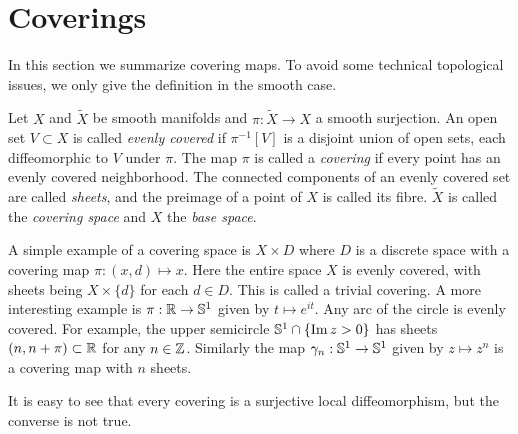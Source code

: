 

\section{Coverings}

In this section we summarize covering maps.
To avoid some technical topological issues, we only give the definition in the smooth case.
\begin{definition}
\label{def:covering map}
\textup{\cite[p.~56]{Hatcher2002}}
Let $X$ and $\tilde{X}$ be smooth manifolds and $\pi : \tilde{X} \to X$ a smooth surjection.
An open set $V \subset X$ is called \emph{evenly covered} if $\pi^{-1}[V]$ is a disjoint union of open sets, each diffeomorphic to $V$ under $\pi$.
The map $\pi$ is called a \emph{covering} if every point has an evenly covered neighborhood.
The connected components of an evenly covered set are called \emph{sheets}, and the preimage of a point of $X$ is called its fibre.
$\tilde{X}$ is called the \emph{covering space} and $X$ the \emph{base space}.
\end{definition}

A simple example of a covering space is $X \times D$ where $D$ is a discrete space with a covering map $\pi : (x,d) \mapsto x$.
Here the entire space $X$ is evenly covered, with sheets being $X \times \{d\}$ for each $d \in D$.
This is called a trivial covering.
A more interesting example is $\pi : \mathbb{R} \to \mathbb{S}^1$ given by $t \mapsto e^{i t}$.
Any arc of the circle is evenly covered. For example, the upper semicircle $\mathbb{S}^1 \cap \{ \operatorname{Im} z > 0 \}$ has sheets $(n,n+ \pi) \subset \mathbb{R}$ for any $n \in \mathbb{Z}$.
Similarly the map $\gamma_n : \mathbb{S}^1 \to \mathbb{S}^1$ given by $z \mapsto z^n$ is a covering map with $n$ sheets.

It is easy to see that every covering is a surjective local diffeomorphism, but the converse is not true.

